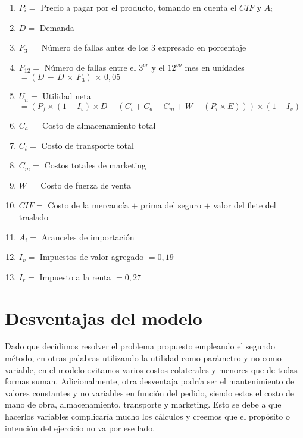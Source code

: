 \documentclass[12pt]{report}
\begin{document}
\begin{enumerate}
    \item $P_{i} =$ Precio a pagar por el producto, tomando en cuenta el $CIF$ y $A_{i}$
    \item $D =$ Demanda
    \item $F_{3} =$ N\'umero de fallas antes de los 3 expresado en porcentaje
    \item $F_{12} =$ N\'umero de fallas entre el $3^{er}$ y el $12^{vo}$ mes en unidades $= (D \, - \, D \, \times \, F_{3}) \, \times \, 0,05$
    \item $U_{n} =$ Utilidad neta $= (P_{f} \times (1 - I_{v}) \times D - (C_{t}+C_{a}+C_{m}+W+(P_{i} \times E)))\times (1-I_{v})$
    \item $C_{a} =$ Costo de almacenamiento total
    \item $C_{t} =$ Costo de transporte total
    \item $C_{m} =$ Costos totales de marketing
    \item $W =$ Costo de fuerza de venta
    \item $CIF =$ Costo de la mercanc\'ia $+$ prima del seguro $+$ valor del flete del traslado
    \item $A_{i} =$ Aranceles de importaci\'on
    \item $I_{v} =$ Impuestos de valor agregado $= 0,19$
    \item $I_{r} =$ Impuesto a la renta $= 0,27$
\end{enumerate}



\section*{Desventajas del modelo}
Dado que decidimos resolver el problema propuesto empleando el segundo m\'etodo, en otras palabras utilizando la utilidad como par\'ametro y no como variable, en el modelo evitamos varios costos colaterales y menores que de todas formas suman. Adicionalmente, otra desventaja podr\'ia ser el mantenimiento de valores constantes y no variables en funci\'on del pedido, siendo estos el costo de mano de obra, almacenamiento, transporte y marketing. Esto se debe a que hacerlos variables complicar\'ia mucho los c\'alculos y creemos que el prop\'osito o intenci\'on del ejercicio no va por ese lado.
\end{document}
